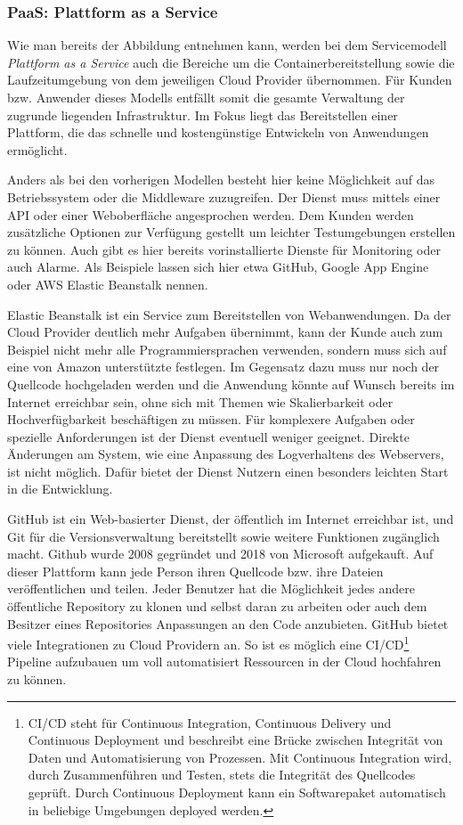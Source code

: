    \subsubsection{PaaS: Plattform as a Service}
   Wie man bereits der Abbildung entnehmen kann, werden bei dem Servicemodell \textsl{Plattform as a Service} auch die Bereiche um die
   Containerbereitstellung sowie die Laufzeitumgebung von dem jeweiligen Cloud Provider übernommen. Für Kunden bzw. Anwender dieses Modells
   entfällt somit die gesamte Verwaltung der zugrunde liegenden Infrastruktur. Im Fokus liegt das Bereitstellen einer Plattform, die das
   schnelle und kostengünstige Entwickeln von Anwendungen ermöglicht.


   Anders als bei den vorherigen Modellen besteht hier keine Möglichkeit auf das Betriebssystem oder die Middleware zuzugreifen.
   Der Dienst muss mittels einer API oder einer Weboberfläche angesprochen werden.
   Dem Kunden werden zusätzliche Optionen zur Verfügung gestellt um leichter Testumgebungen erstellen zu können.
   Auch gibt es hier bereits vorinstallierte Dienste für Monitoring oder auch Alarme.
   Als Beispiele lassen sich hier etwa GitHub, Google App Engine oder AWS Elastic Beanstalk nennen.

\clearpage
   Elastic Beanstalk ist ein Service zum Bereitstellen von Webanwendungen. Da der Cloud Provider deutlich mehr Aufgaben übernimmt, kann der Kunde
   auch zum Beispiel nicht mehr alle Programmiersprachen verwenden, sondern muss sich auf eine von Amazon unterstützte festlegen.
   Im Gegensatz dazu muss nur noch der Quellcode hochgeladen werden und die Anwendung könnte auf Wunsch bereits im Internet erreichbar sein, ohne sich mit Themen
   wie Skalierbarkeit oder Hochverfügbarkeit beschäftigen zu müssen. Für komplexere Aufgaben oder spezielle Anforderungen ist der Dienst eventuell weniger geeignet.
   Direkte Änderungen am System, wie eine Anpassung des Logverhaltens des Webservers, ist nicht möglich.
   Dafür bietet der Dienst Nutzern einen besonders leichten Start in die Entwicklung.

   GitHub ist ein Web-basierter Dienst, der öffentlich im Internet erreichbar ist, und Git für die Versionsverwaltung bereitstellt sowie weitere Funktionen zugänglich macht.
   Github wurde 2008 gegründet und 2018 von Microsoft aufgekauft. Auf dieser Plattform kann jede Person ihren Quellcode bzw. ihre Dateien veröffentlichen und teilen.
   Jeder Benutzer hat die Möglichkeit jedes andere öffentliche Repository zu klonen und selbst daran zu arbeiten oder auch dem Besitzer eines Repositories
   Anpassungen an den Code anzubieten. GitHub bietet viele Integrationen zu Cloud Providern an. So ist es möglich eine CI/CD\footnote{CI/CD steht für
   Continuous Integration, Continuous Delivery und Continuous Deployment und beschreibt eine Brücke zwischen Integrität von Daten und Automatisierung von Prozessen.
   Mit Continuous Integration wird, durch Zusammenführen und Testen, stets die Integrität des Quellcodes geprüft.
   Durch Continuous Deployment kann ein Softwarepaket automatisch in beliebige Umgebungen deployed werden. } Pipeline aufzubauen um voll automatisiert Ressourcen in der Cloud hochfahren zu können. \cite{GitHub}


